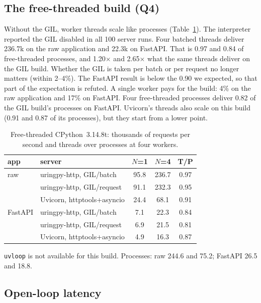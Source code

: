 \documentclass[10pt,twocolumn,letterpaper]{article}
\newcommand{\code}[1]{\texttt{#1}}
\newcommand{\kx}{$\times$}
\begin{document}
\subsection{The free-threaded build (Q4)}

Without the GIL, worker threads scale like processes
(Table~\ref{tab:ft}). The interpreter reported the GIL disabled in all 100
server runs. Four batched threads deliver 236.7k on the raw application and
22.3k on FastAPI. That is 0.97 and 0.84 of free-threaded processes, and
1.20\kx{} and 2.65\kx{} what the same threads deliver on the GIL build.
Whether the GIL is taken per batch or per request no longer matters (within
2--4\%). The FastAPI result is below the 0.90 we expected, so that part of
the expectation is refuted. A single worker pays for the build: 4\% on the
raw application and 17\% on FastAPI. Four free-threaded processes deliver
0.82 of the GIL build's processes on FastAPI. Uvicorn's threads also scale
on this build (0.91 and 0.87 of its processes), but they start from a
lower point.

\begin{table}[t]
\caption{Free-threaded CPython~3.14.8t: thousands of requests per second and threads over processes at four workers.}
\label{tab:ft}
\centering\footnotesize
\begin{tabular}{@{}llccc@{}}
\toprule
app & server & $N$=1 & $N$=4 & T/P\\
\midrule
raw & uringpy-http, GIL/batch & 95.8 & 236.7 & 0.97\\
 & uringpy-http, GIL/request & 91.1 & 232.3 & 0.95\\
 & Uvicorn, httptools+asyncio & 24.4 & 68.1 & 0.91\\
\midrule
FastAPI & uringpy-http, GIL/batch & 7.1 & 22.3 & 0.84\\
 & uringpy-http, GIL/request & 6.9 & 21.5 & 0.81\\
 & Uvicorn, httptools+asyncio & 4.9 & 16.3 & 0.87\\
\bottomrule
\end{tabular}
\par\smallskip\raggedright\scriptsize \code{uvloop} is not available for this build. Processes: raw 244.6 and 75.2; FastAPI 26.5 and 18.8.
\end{table}

\subsection{Open-loop latency}
\end{document}
